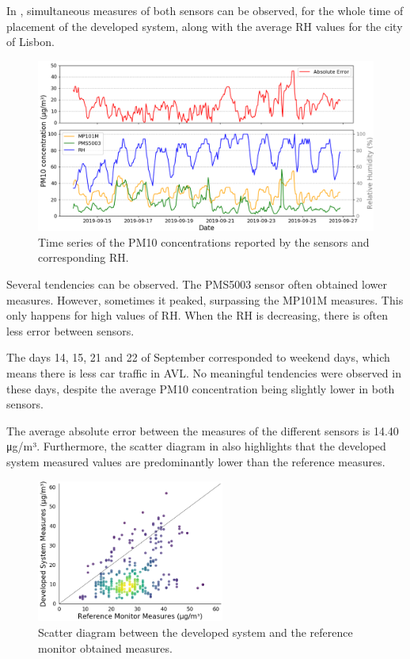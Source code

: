 In , simultaneous measures of both sensors can be observed, for the whole time of placement of the developed system, along with the average RH values for the city of Lisbon.

\begin{figure}[ht]
\centering
\includegraphics[width=1\textwidth]{./Images/Results/calibration2.png}
\caption{Time series of the PM10 concentrations reported by the sensors and corresponding RH.}
\label{fig:system-calibration}
\end{figure}

Several tendencies can be observed. The PMS5003 sensor often obtained lower measures. However, sometimes it peaked, surpassing the MP101M measures. This only happens for high values of RH. When the RH is decreasing, there is often less error between sensors.


The days 14, 15, 21 and 22 of September corresponded to weekend days, which means there is less car traffic in AVL. No meaningful tendencies were observed in these days, despite the average PM10 concentration being slightly lower in both sensors.

The average absolute error between the measures of the different sensors is 14.40 μg/m³. Furthermore, the scatter diagram in  also highlights that the developed system measured values are predominantly lower than the reference measures.

\begin{figure}[ht]
\centering
\includegraphics[width=0.55\textwidth]{./Images/Results/scatter-measurements.png}
\caption{Scatter diagram between the developed system and the reference monitor obtained measures.}
\label{fig:scatter-measurements}
\end{figure}

